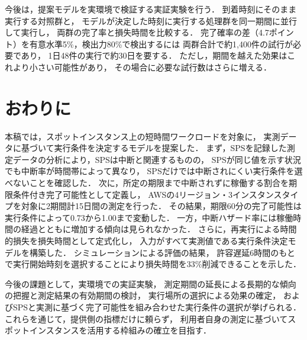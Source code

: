 \documentclass[submit,techrep,noauthor]{ipsj}
\begin{document}
今後は，提案モデルを実環境で検証する実証実験を行う．
到着時刻にそのまま実行する対照群と，
モデルが決定した時刻に実行する処理群を同一期間に並行して実行し，
両群の完了率と損失時間を比較する．
完了確率の差（4.7ポイント）を有意水準5\%，検出力80\%で検出するには
両群合計で約1,400件の試行が必要であり，
1日48件の実行で約30日を要する．
ただし，期間を越えた効果はこれより小さい可能性があり，
その場合に必要な試行数はさらに増える．


\section{おわりに}
\label{sec:conclusion}

本稿では，スポットインスタンス上の短時間ワークロードを対象に，
実測データに基づいて実行条件を決定するモデルを提案した．
まず，SPSを記録した測定データの分析により，SPSは中断と関連するものの，
SPSが同じ値を示す状況でも中断率が時間帯によって異なり，
SPSだけでは中断されにくい実行条件を選べないことを確認した．
次に，所定の期限まで中断されずに稼働する割合を期限条件付き完了可能性として定義し，
AWSの4リージョン・3インスタンスタイプを対象に2期間計15日間の測定を行った．
その結果，期限60分の完了可能性は実行条件によって0.73から1.00まで変動した．
一方，中断ハザード率には稼働時間の経過とともに増加する傾向は見られなかった．
さらに，再実行による時間的損失を損失時間として定式化し，
入力がすべて実測値である実行条件決定モデルを構築した．
シミュレーションによる評価の結果，
許容遅延6時間のもとで実行開始時刻を選択することにより損失時間を33\%削減できることを示した．

今後の課題として，実環境での実証実験，
測定期間の延長による長期的な傾向の把握と測定結果の有効期間の検討，
実行場所の選択による効果の確定，
およびSPSと実測に基づく完了可能性を組み合わせた実行条件の選択が挙げられる．
これらを通じて，提供側の指標だけに頼らず，
利用者自身の測定に基づいてスポットインスタンスを活用する枠組みの確立を目指す．
\end{document}
